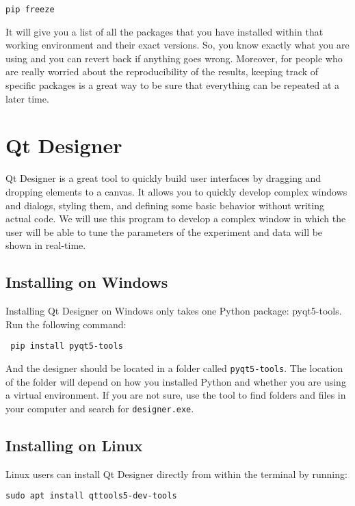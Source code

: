 \begin{verbatim}
pip freeze
\end{verbatim}

It will give you a list of all the packages that you have installed within that working environment and their exact versions. So, you know exactly what you are using and you can revert back if anything goes wrong. Moreover, for people who are really worried about the reproducibility of the results, keeping track of specific packages is a great way to be sure that everything can be repeated at a later time.

\section{Qt Designer}
Qt Designer is a great tool to quickly build user interfaces by dragging and dropping elements to a canvas. It allows you to quickly develop complex windows and dialogs, styling them, and defining some basic behavior without writing actual code. We will use this program to develop a complex window in which the user will be able to tune the parameters of the experiment and data will be shown in real-time. 

\subsection{Installing on Windows}
Installing Qt Designer on Windows only takes one Python package: pyqt5-tools. Run the following command:

\begin{verbatim}
 pip install pyqt5-tools
\end{verbatim}

And the designer should be located in a folder called \texttt{pyqt5-tools}. The location of the folder will depend on how you installed Python and whether you are using a virtual environment. If you are not sure, use the tool to find folders and files in your computer and search for \texttt{designer.exe}.

\subsection{Installing on Linux}
Linux users can install Qt Designer directly from within the terminal by running:

\begin{verbatim}
sudo apt install qttools5-dev-tools
\end{verbatim}

